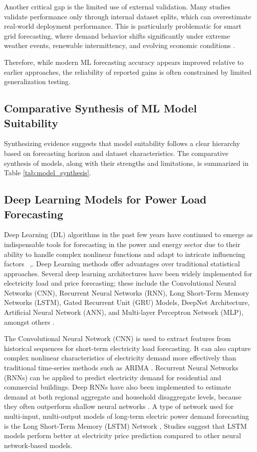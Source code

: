 \documentclass[conference]{IEEEtran}
\begin{document}
Another critical gap is the limited use of external validation. Many studies validate performance only through internal dataset splits, which can overestimate real-world deployment performance. This is particularly problematic for smart grid forecasting, where demand behavior shifts significantly under extreme weather events, renewable intermittency, and evolving economic conditions \cite{azeem2021,habbak2023}.

Therefore, while modern ML forecasting accuracy appears improved relative to earlier approaches, the reliability of reported gains is often constrained by limited generalization testing.

\subsection{Comparative Synthesis of ML Model Suitability}

Synthesizing evidence suggests that model suitability follows a clear hierarchy based on forecasting horizon and dataset characteristics. The comparative synthesis of models, along with their strengths and limitations, is summarized in Table \ref{tab:model_synthesis}.

\subsection {Deep Learning Models for Power Load Forecasting}
Deep Learning (DL) algorithms in the past few years have continued to emerge as indispensable tools for forecasting in the power and energy sector due to their ability to handle complex nonlinear functions and adapt to intricate influencing factors ~\cite {pallonetto2021},\cite{zhao2025short}. Deep Learning methods offer advantages over traditional statistical approaches. Several deep learning architectures have been widely implemented for electricity load and price forecasting; these include the Convolutional Neural Networks (CNN), Recurrent Neural Networks (RNN), Long Short-Term Memory Networks (LSTM), Gated Recurrent Unit (GRU) Models, DeepNet Architecture, Artificial Neural Network (ANN), and Multi-layer Perceptron Network (MLP), amongst others \cite{bedi2019deep,pallonetto2021,zhao2025short,ugbehe2025}. 


The Convolutional Neural Network (CNN) is used to extract features from historical sequences for short-term electricity load forecasting. It can also capture complex nonlinear characteristics of electricity demand more effectively than traditional time-series methods such as ARIMA \cite{bedi2019deep,zhao2025short}. Recurrent Neural Networks (RNNs) can be applied to predict electricity demand for residential and commercial buildings. Deep RNNs have also been implemented to estimate demand at both regional aggregate and household disaggregate levels, because they often outperform shallow neural networks \cite{bedi2019deep}. A type of network used for multi-input, multi-output models of long-term electric power demand forecasting is the Long Short-Term Memory (LSTM) Network \cite{ugbehe2025}, Studies suggest that LSTM models perform better at electricity price prediction compared to other neural network-based models. 
\end{document}
